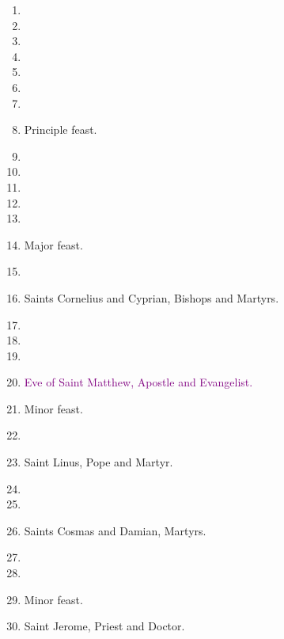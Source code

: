 		\begin{enumerate}
			\item %
			\item %
			\item %
			\item %
			\item %
			\item %
			\item %
			\item {} Principle feast.
			\item %
			\item %
			\item %
			\item %
			\item %
			\item {} Major feast.
			\item %
			\item Saints Cornelius and Cyprian, Bishops and Martyrs. 
			\item %
			\item %
			\item %
			\item \textcolor{purple}{Eve of Saint Matthew, Apostle and Evangelist.}
			\item {} Minor feast.
			\item %
			\item Saint Linus, Pope and Martyr. 
			\item %
			\item %
			\item Saints Cosmas and Damian, Martyrs. 
			\item %
			\item %
			\item {} Minor feast.
			\item Saint Jerome, Priest and Doctor. 
		\end{enumerate}


